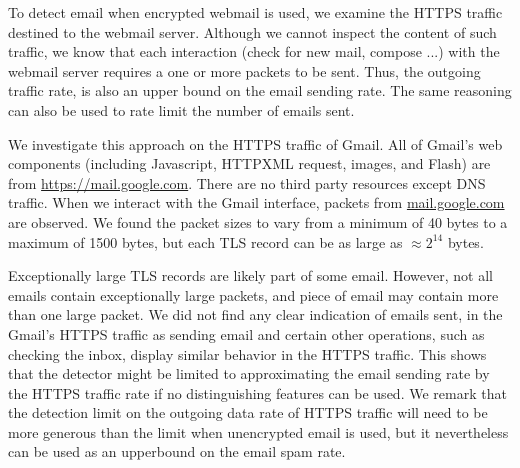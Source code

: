 To detect email when encrypted webmail is used, 
we examine the HTTPS traffic destined to the webmail server. 
Although we cannot inspect the content of such traffic, 
we know that each interaction (check for new mail, compose ...) 
with the webmail server requires a one or more packets to be sent. 
Thus, the outgoing traffic rate, is also an upper bound on the email
sending rate.
The same reasoning can also be used to rate limit the number of emails sent.

We investigate this approach on the HTTPS traffic of Gmail. 
All of Gmail's web components (including Javascript, HTTPXML request,
images, and Flash) are from \url{https://mail.google.com}.
There are no third party resources except DNS traffic.
When we interact with the Gmail interface, packets from \url{mail.google.com} are observed.
We found the packet sizes to
vary from a minimum of 40 bytes to a maximum of 1500 bytes,
but each TLS record can be as large as $\approx 2^{14}$ bytes. 

Exceptionally large TLS records are likely part of some email.
However, not all emails contain exceptionally large packets, and piece
of email may contain more than one large packet. 
We did not find any clear indication of emails sent, in the
Gmail's HTTPS traffic as
sending email and certain other operations, such as checking the inbox,
display similar behavior in the HTTPS traffic.
This shows that the detector might be limited to approximating
the email sending rate by the HTTPS traffic rate if no distinguishing
features can be used.
We remark that the detection limit on the outgoing data rate of 
HTTPS traffic will need to be more generous than the limit when 
unencrypted email is used, 
but it nevertheless can be used as an upperbound on the email spam rate.

